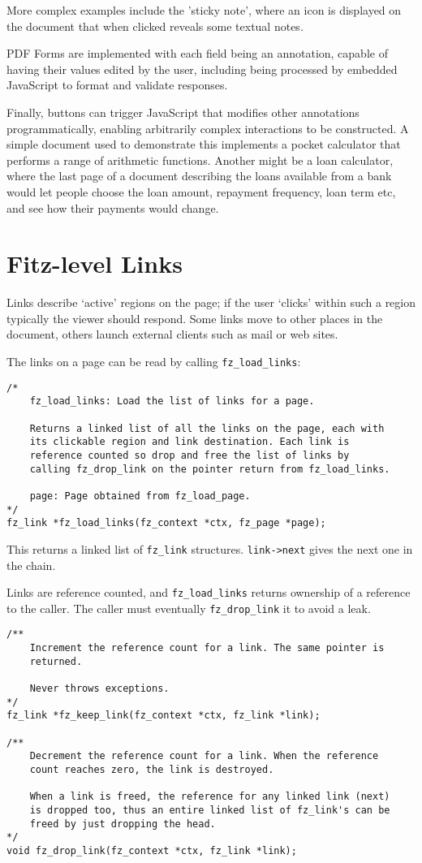 \documentclass[oneside]{book}
\begin{document}
More complex examples include the 'sticky note', where an icon is displayed on the document that when clicked reveals some textual notes.

PDF Forms are implemented with each field being an annotation, capable of having their values edited by the user, including being processed by embedded JavaScript to format and validate responses.

Finally, buttons can trigger JavaScript that modifies other annotations programmatically, enabling arbitrarily complex interactions to be constructed. A simple document used to demonstrate this implements a pocket calculator that performs a range of arithmetic functions. Another might be a loan calculator, where the last page of a document describing the loans available from a bank would let people choose the loan amount, repayment frequency, loan term etc, and see how their payments would change.

\section{Fitz-level Links}

Links describe `active' regions on the page; if the user `clicks' within such a region typically the viewer should respond. Some links move to other places in the document, others launch external clients such as mail or web sites.

The links on a page can be read by calling \texttt{fz\_load\_links}:

\begin{lstlisting}
/*
	fz_load_links: Load the list of links for a page.

	Returns a linked list of all the links on the page, each with
	its clickable region and link destination. Each link is
	reference counted so drop and free the list of links by
	calling fz_drop_link on the pointer return from fz_load_links.

	page: Page obtained from fz_load_page.
*/
fz_link *fz_load_links(fz_context *ctx, fz_page *page);
\end{lstlisting}

This returns a linked list of \texttt{fz\_link} structures. \texttt{link->next} gives the next one in the chain.

Links are reference counted, and \texttt{fz\_load\_links} returns ownership of a reference to the caller. The caller must eventually \texttt{fz\_drop\_link} it to avoid a leak.

\begin{lstlisting}
/**
	Increment the reference count for a link. The same pointer is
	returned.

	Never throws exceptions.
*/
fz_link *fz_keep_link(fz_context *ctx, fz_link *link);

/**
	Decrement the reference count for a link. When the reference
	count reaches zero, the link is destroyed.

	When a link is freed, the reference for any linked link (next)
	is dropped too, thus an entire linked list of fz_link's can be
	freed by just dropping the head.
*/
void fz_drop_link(fz_context *ctx, fz_link *link);
\end{lstlisting}
\end{document}
